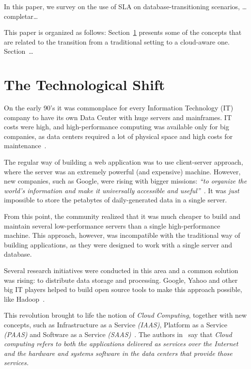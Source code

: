 \documentclass{article}
\begin{document}
In this paper, we survey on the use of SLA on database-transitioning scenarios, \dots {\sc completar\dots}

\bigskip

This paper is organized as follows: 
Section~\ref{sec:tts} presents some of the concepts that are related to the transition from a traditional setting to a cloud-aware one.
Section~\dots

\section{The Technological Shift}
\label{sec:tts}


On the early 90's it was commonplace for every Information Technology (IT) company to have its own Data Center with huge servers and mainframes. 
IT costs were high, and high-performance computing was available only for big companies, as data centers required a lot of physical space and high costs for maintenance~\cite{XXXXX}.

The regular way of building a web application was to use client-server approach, where the server was an extremely powerful (and expensive) machine. 
However, new companies, such as Google, were rising with bigger missions: \textit{``to organize the world's information and make it universally accessible and useful''}~\cite{XXXX}. 
It was \textit{just} impossible to store the petabytes of daily-generated data in a single server. 

From this point, the community realized that it was much cheaper to build and maintain several low-performance servers than a single high-performance machine.
This approach, however, was incompatible with the traditional way of building applications, as they were designed to work with a single server and database. 

Several research initiatives were conducted in this area and a common solution was rising: to distribute data storage and processing. 
Google, Yahoo and other big IT players helped to build open source tools to make this approach possible, like Hadoop~\cite{Haddop}.

This revolution brought to life the notion of \textit{Cloud Computing}, together with new concepts, such as Infrastructure as a Service \textit{(IAAS)}, Platform as a Service \textit{(PAAS)} and Software as a Service \textit{(SAAS)}~\cite{YYY}.
The authors in~\cite{AViewOfCloudComputing} say that \textit{Cloud computing refers to both the applications delivered as services over the Internet and the hardware and systems software in the data centers that provide those services.} 
\end{document}
